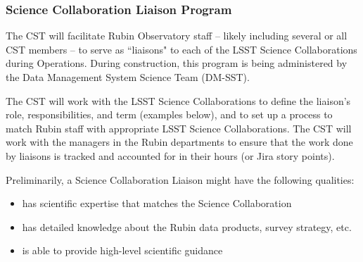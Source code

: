 \documentclass[DM,authoryear,toc]{lsstdoc}
\begin{document}
\subsubsection{Science Collaboration Liaison Program}\label{sssec:mod_interface_SCliaison}

The CST will facilitate Rubin Observatory staff -- likely including several or all CST members -- to serve as ``liaisons" to each of the LSST Science Collaborations during Operations. 
During construction, this program is being administered by the Data Management System Science Team (DM-SST).

The CST will work with the LSST Science Collaborations to define the liaison's role, responsibilities, and term (examples below), and to set up a process to match Rubin staff with appropriate LSST Science Collaborations.
The CST will work with the managers in the Rubin departments to ensure that the work done by liaisons is tracked and accounted for in their hours (or Jira story points). 

Preliminarily, a Science Collaboration Liaison might have the following qualities:
\begin{itemize}
\item has scientific expertise that matches the Science Collaboration
\item has detailed knowledge about the Rubin data products, survey strategy, etc. 
\item is able to provide high-level scientific guidance 
\end{itemize}
\end{document}
